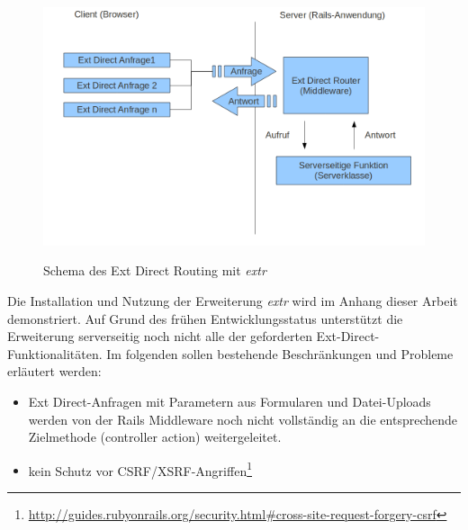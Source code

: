 \begin{figure}[!ht]
\begin{center}
\label{fig.directrouter}
\includegraphics[scale=0.3]{images/rack/extdirect.png}
\caption{Schema des Ext Direct Routing mit \emph{extr}}
\end{center}
\end{figure}

Die Installation und Nutzung der Erweiterung \emph{extr} wird im Anhang dieser Arbeit demonstriert. Auf Grund des frühen Entwicklungsstatus unterstützt die Erweiterung serverseitig noch nicht alle der geforderten Ext-Direct-Funktionalitäten. Im folgenden sollen bestehende Beschränkungen und Probleme erläutert werden:
\begin{itemize}
\item
Ext Direct-Anfragen mit Parametern aus Formularen und Datei-Uploads werden von der Rails Middleware noch nicht vollständig an die entsprechende Zielmethode (controller action) weitergeleitet.
\item
kein Schutz vor CSRF/XSRF-Angriffen\footnote{\href{http://guides.rubyonrails.org/security.html\#cross-site-request-forgery-csrf}{http://guides.rubyonrails.org/security.html\#cross-site-request-forgery-csrf}}
\end{itemize}

